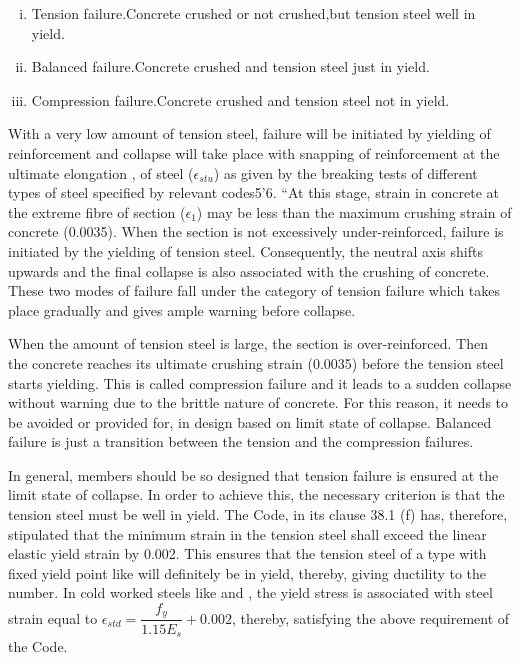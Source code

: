 \begin{enumerate}[(i)]
\item Tension failure.Concrete crushed or not crushed,but tension steel well in yield.
\item Balanced failure.Concrete crushed and tension steel just in yield.
\item Compression failure.Concrete crushed and tension steel not in yield.
\end{enumerate}
With a very low amount of tension steel, failure will be initiated by
yielding of reinforcement and collapse will take place with snapping of
reinforcement at the ultimate elongation , of steel ($\epsilon_{stu}$) as
given by the breaking tests of different types of steel speciﬁed by
relevant codes5’6. “At this stage, strain in concrete at the extreme
fibre of section ($\epsilon_1$) may be less than the maximum crushing
strain of concrete (0.0035). When the section is not excessively
under-reinforced, failure is initiated by the yielding of tension steel.
Consequently, the neutral axis shifts upwards and the final collapse is
also associated with the crushing of concrete. These two modes of failure
fall under the category of tension failure which takes place gradually
and gives ample warning before collapse.

When the amount of tension steel is large, the section is over-reinforced.
Then the concrete reaches its ultimate crushing strain (0.0035)
before the tension steel starts yielding. This is called compression
failure and it leads to a sudden collapse without warning due to the
brittle nature of concrete. For this reason, it needs to be avoided or
provided for, in design based on limit state of collapse. Balanced
failure is just a transition between the tension and the compression
failures.

In general, members should be so designed that tension failure
is ensured at the limit state of collapse. In order to achieve this, the
necessary criterion is that the tension steel must be well in yield. The
Code, in its clause 38.1 (f) has, therefore, stipulated that the minimum
strain in the tension steel shall exceed the linear elastic yield strain
by 0.002. This ensures that the tension steel of a type with fixed yield
point like {\fetwofivezero} will deﬁnitely be in yield, thereby, giving
ductility to the number. In cold worked steels like {\fefouronefive} and
{\fefivezerozero}, the yield stress is associated with steel strain equal to              
$\epsilon_{std}=\dfrac{f_y}{1.15 E_s}+0.002$, thereby, satisfying the
above requirement of the Code.

